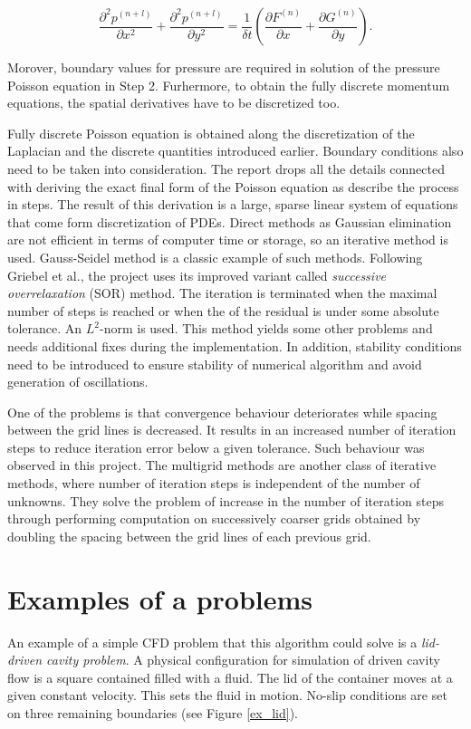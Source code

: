 \begin{equation} \label{eq:poisson}
	\frac{\partial^2 p^{(n+l)}}{\partial x^2}+\frac{\partial^2 p^{(n+l)}}{\partial y^2} = \frac{1}{\delta t} \left( \frac{\partial F^{(n)}}{\partial x} + \frac{\partial G^{(n)}}{\partial y} \right).
\end{equation}

Morover, boundary values for pressure are required in solution of the pressure Poisson equation in Step 2. Furhermore, to obtain the fully discrete momentum equations, the spatial derivatives have to be discretized too. 

Fully discrete Poisson equation is obtained along the discretization of the Laplacian and the discrete quantities introduced earlier. Boundary conditions also need to be taken into consideration. The report drops all the details connected with deriving the exact final form of the Poisson equation as \cite{griebel1998numerical} describe the process in steps. The result of this derivation is a large, sparse linear system of equations that come form discretization of PDEs. Direct methods as Gaussian elimination are not efficient in terms of computer time or storage, so an iterative method is used. Gauss-Seidel method is a classic example of such methods. Following Griebel et al., the project uses its improved variant called \emph{successive overrelaxation} (SOR) method. The iteration is terminated when the maximal number of steps is reached or when the of the residual is under some absolute tolerance. An $L^2$-norm is used. This method yields some other problems and needs additional fixes during the implementation. In addition, stability conditions need to be introduced to ensure stability of numerical algorithm and avoid generation of oscillations.

One of the problems is that convergence behaviour deteriorates while spacing between the grid lines is decreased. It results in an increased number of iteration steps to reduce iteration error below a given tolerance. Such behaviour was observed in this project. The multigrid methods are another class of iterative methods, where number of iteration steps is independent of the number of unknowns. They solve the problem of increase in the number of iteration steps through performing computation on successively coarser grids obtained by doubling the spacing between the grid lines of each previous grid.

\section{Examples of a problems}
An example of a simple CFD problem that this algorithm could solve is a \emph{lid-driven cavity problem}. A physical configuration for simulation of driven cavity flow is a square contained filled with a fluid. The lid of the container moves at a given constant velocity. This sets the fluid in motion. No-slip conditions are set on three remaining boundaries (see Figure \ref{ex_lid}). 

